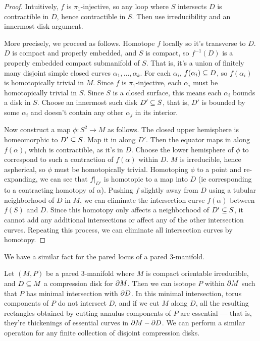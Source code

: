 \begin{proof}

Intuitively, $f$ is $\pi_1$-injective, so any loop where $S$ intersects $D$ is
contractible in $D$, hence contractible in $S$. Then use irreducibility and an
innermost disk argument.

More precisely, we proceed as follows. Homotope $f$ locally so it's transverse
to $D$. $D$ is compact and properly embedded, and $S$ is compact, so
$f^{-1}(D)$ is a properly embedded compact submanifold of $S$. That is, it's
a union of finitely many disjoint simple closed curves
$\alpha_1,\dots,\alpha_k$.  For each $\alpha_i$, $f(\alpha_i) \subseteq D$, so
$f(\alpha_i)$ is homotopically trivial in $M$.  Since $f$ is $\pi_1$-injective,
each $\alpha_i$ must be homotopically trivial in $S$.  Since $S$ is a closed
surface, this means each $\alpha_i$ bounds a disk in $S$.  Choose an innermost
such disk $D' \subseteq S$, that is, $D'$ is bounded by some $\alpha_i$ and doesn't
contain any other $\alpha_j$ in its interior.

Now construct a map $\phi \colon S^2 \to M$ as follows. The closed upper
hemisphere is homeomorphic to $D' \subseteq S$. Map it in along $D'$. Then the
equator maps in along $f(\alpha)$, which is contractible, as it's in $D$.
Choose the lower hemisphere of $\phi$ to correspond to such a contraction of
$f(\alpha)$ within $D$.  $M$ is irreducible, hence aspherical, so $\phi$ must
be homotopically trivial.  Homotoping $\phi$ to a point and re-expanding, we
can see that $f|_{D'}$ is homotopic to a map into $D$ (ie corresponding to
a contracting homotopy of $\alpha$). Pushing $f$ slightly away from $D$ using
a tubular neighborhood of $D$ in $M$, we can eliminate the intersection curve
$f(\alpha)$ between $f(S)$ and $D$.  Since this homotopy only affects
a neighborhood of $D' \subseteq S$, it cannot add any additional intersections or
affect any of the other intersection curves.  Repeating this process, we can
eliminate all intersection curves by homotopy.

\end{proof}

We have a similar fact for the pared locus of a pared $3$-manifold.

\begin{prop}\label{P:pared1}

Let $(M,P)$ be a pared $3$-manifold where $M$ is compact orientable
irreducible, and $D \subseteq M$ a compression disk for $\partial M$. Then we can isotope
$P$ within $\partial M$ such that $P$ has minimal intersection with $\partial D$. In this
minimal intersection, torus components of $P$ do not intersect $D$, and if we
cut $M$ along $D$, all the resulting rectangles obtained by cutting annulus
components of $P$ are essential --- that is, they're thickenings of essential
curves in $\partial M - \partial D$.  We can perform a similar operation for any finite
collection of disjoint compression disks.

\end{prop}


